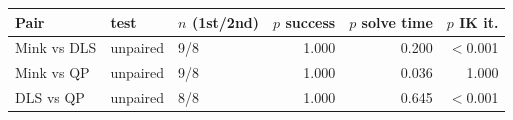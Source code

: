 \begin{tabular}{lllrrr}
\toprule
Pair & test & $n$ (1st/2nd) & $p$ success & $p$ solve time & $p$ IK it.\\
\midrule
Mink vs DLS & unpaired & 9/8 & 1.000 & 0.200 & $<$0.001\\
Mink vs QP & unpaired & 9/8 & 1.000 & 0.036 & 1.000\\
DLS vs QP & unpaired & 8/8 & 1.000 & 0.645 & $<$0.001\\
\bottomrule
\end{tabular}
